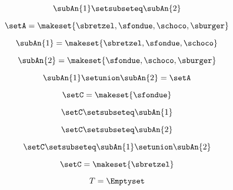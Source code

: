 \begin{forslides}
    \begin{equation}
        \label{eq:systems-070}
        \subAn{1} \setsubseteq \subAn{2}
    \end{equation}

    \begin{equation}
        \label{eq:systems-071}
        \setA = \makeset{ \sbretzel, \sfondue, \schoco, \sburger }
    \end{equation}

    \begin{equation}
        \label{eq:systems-071b}
        \subAn{1} = \makeset{ \sbretzel, \sfondue, \schoco }
    \end{equation}

    \begin{equation}
        \label{eq:systems-072}
        \subAn{2} = \makeset{\sfondue, \schoco, \sburger }
    \end{equation}

    \begin{equation}
        \label{eq:systems-073}
        \subAn{1} \setunion \subAn{2} = \setA
    \end{equation}

    \begin{equation}
        \label{eq:systems-074}
        \setC = \makeset{ \sfondue }
    \end{equation}

    \begin{equation}
        \label{eq:systems-075}
        \setC \setsubseteq \subAn{1}
    \end{equation}

    \begin{equation}
        \label{eq:systems-076}
        \setC \setsubseteq \subAn{2}
    \end{equation}

    \begin{equation}
        \label{eq:systems-077}
        \setC \setsubseteq \subAn{1} \setunion \subAn{2}
    \end{equation}

    \begin{equation}
        \label{eq:systems-078}
        \setC = \makeset{ \sbretzel }
    \end{equation}

    \begin{equation}
        \label{eq:systems-079}
        T = \Emptyset
    \end{equation}


\end{forslides}
